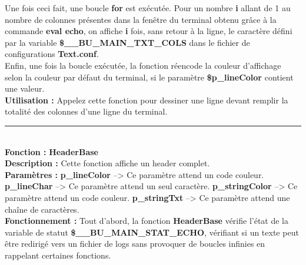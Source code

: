 \documentclass[a4paper,10pt]{article}
\begin{document}
Une fois ceci fait, une boucle \textbf{for} est exécutée. Pour un nombre \textbf{i} allant de 1 au nombre de colonnes présentes dans la fenêtre du terminal obtenu grâce à la commande \color{gray}\textbf{eval echo}\color{white}, on affiche \textbf{i} fois, sans retour à la ligne, le caractère défini par la variable \color{orange}\textbf{\$\_\_BU\_MAIN\_TXT\_COLS }\color{white} dans le fichier de\linebreak
configurations \color{lime}\textbf{Text.conf}\color{white}.\\[1\baselineskip]

Enfin, une fois la boucle exécutée, la fonction réencode la couleur d'affichage selon la couleur par\linebreak
défaut du terminal, si le paramètre \color{orange}\textbf{\$p\_lineColor }\color{white} contient une valeur.\\[1\baselineskip]

\textbf{Utilisation :}\linebreak
Appelez cette fonction pour dessiner une ligne devant remplir la totalité des colonnes d'une ligne du terminal.\\[2\baselineskip]


\par\noindent\rule{\textwidth}{0.4pt}\\[1\baselineskip]

\textbf{Fonction : }\color{mauve}\textbf{HeaderBase}\color{white}\\[1\baselineskip]
\textbf{Description :}\linebreak
Cette fonction affiche un header complet.\\[1\baselineskip]

\textbf{Paramètres :}\linebreak
\color{orange}\textbf{p\_lineColor }\color{white} --> Ce paramètre attend un code couleur.\linebreak
\color{orange}\textbf{p\_lineChar }\color{white} --> Ce paramètre attend un seul caractère.\linebreak
\color{orange}\textbf{p\_stringColor }\color{white} --> Ce paramètre attend un code couleur.\linebreak
\color{orange}\textbf{p\_stringTxt }\color{white} --> Ce paramètre attend une chaîne de caractères.\\[1\baselineskip]

\textbf{Fonctionnement :}\linebreak
Tout d'abord, la fonction \color{mauve}\textbf{HeaderBase }\color{white} vérifie l'état de la variable de statut \color{orange}\textbf{\$\_\_BU\_MAIN\_STAT\_ECHO}\color{white}, vérifiant si un texte peut être redirigé vers un fichier de logs sans provoquer de boucles infinies en\linebreak
rappelant certaines fonctions\color{white}.\\[1\baselineskip]
\end{document}

